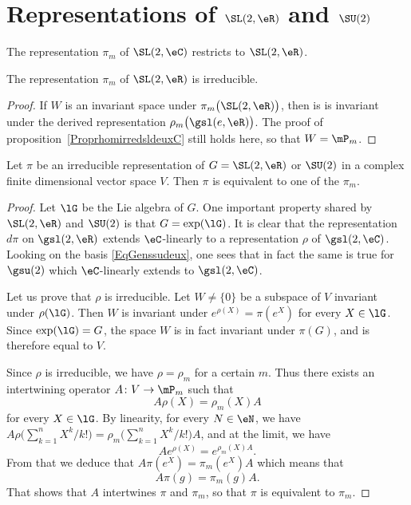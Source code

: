 \section{Representations of \texorpdfstring{$ \SL(2,\eR)$}{SL(2,R)} and \texorpdfstring{$ \SU(2)$}{SU(2)}}

The representation $\pi_m$ of $\SL(2,\eC)$ restricts to $\SL(2,\eR)$.

\begin{lemma}
The representation $\pi_m$ of $\SL(2,\eR)$ is irreducible.
\end{lemma}

\begin{proof}
If $W$ is an invariant space under $\pi_m\big( \SL(2,\eR) \big)$, then is is invariant under the derived representation $\rho_m\big( \gsl(e,\eR) \big)$. The proof of proposition~\ref{ProprhomirredsldeuxC} still holds here, so that $W=\mP_m$.
\end{proof}

\begin{theorem}
Let $\pi$ be an irreducible representation of $G=\SL(2,\eR)$ or $\SU(2)$ in a complex finite dimensional vector space $V$. Then $\pi$ is equivalent to one of the $\pi_m$.
\end{theorem}

\begin{proof}
Let $\lG$ be the Lie algebra of $G$. One important property shared by $\SL(2,\eR)$ and $\SU(2)$ is that $G=\exp(\lG)$. It is clear that the representation $d\pi$ on $\gsl(2,\eR)$ extends $\eC$-linearly to a representation $\rho$ of $\gsl(2,\eC)$. Looking on the basis \eqref{EqGenssudeux}, one sees that in fact the same is true for $\gsu(2)$ which $\eC$-linearly extends to $\gsl(2,\eC)$.

Let us prove that $\rho$ is irreducible. Let $W\neq\{ 0 \}$ be a subspace of $V$ invariant under $\rho(\lG)$. Then $W$ is invariant under $ e^{\rho(X)}=\pi( e^{X})$ for every $X\in\lG$. Since $\exp(\lG)=G$, the space $W$ is in fact invariant under $\pi(G)$, and is therefore equal to $V$.

Since $\rho$ is irreducible, we have $\rho=\rho_m$ for a certain $m$. Thus there exists an intertwining operator $A\colon V\to \mP_m$ such that
\[
	A\rho(X)=\rho_m(X)A
\]
for every $X\in\lG$. By linearity, for every $N\in\eN$, we have $A\rho\big( \sum_{k=1}^n X^k/k! \big)=\rho_m\big( \sum_{k=1}^n X^k/k! \big)A$, and at the limit, we have
\begin{equation}
	A e^{\rho(X)}= e^{\rho_m(X)A}.
\end{equation}
From that we deduce that $A\pi( e^{X})=\pi_m( e^{X})A$ which means that
\[
	A\pi(g)=\pi_m(g)A.
\]
That shows that $A$ intertwines $\pi$ and $\pi_m$, so that $\pi$ is equivalent to $\pi_m$.
\end{proof}
